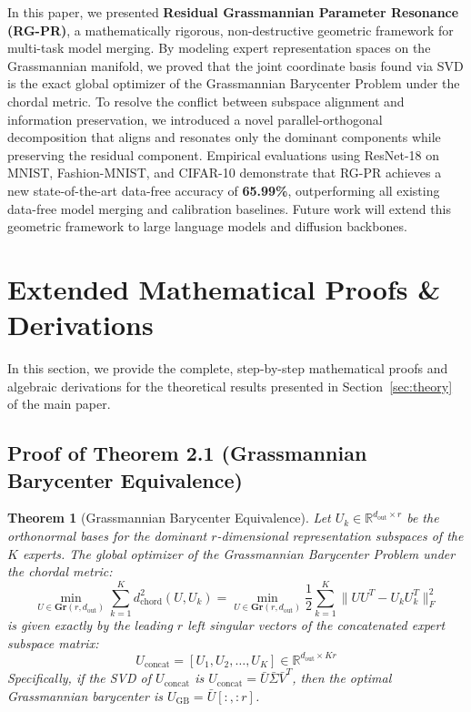 \documentclass{article}
\theoremstyle{plain}
\newtheorem*{theorem*}{Theorem}
\theoremstyle{definition}
\theoremstyle{remark}
\begin{document}
In this paper, we presented \textbf{Residual Grassmannian Parameter Resonance (RG-PR)}, a mathematically rigorous, non-destructive geometric framework for multi-task model merging. By modeling expert representation spaces on the Grassmannian manifold, we proved that the joint coordinate basis found via SVD is the exact global optimizer of the Grassmannian Barycenter Problem under the chordal metric. To resolve the conflict between subspace alignment and information preservation, we introduced a novel parallel-orthogonal decomposition that aligns and resonates only the dominant components while preserving the residual component. Empirical evaluations using ResNet-18 on MNIST, Fashion-MNIST, and CIFAR-10 demonstrate that RG-PR achieves a new state-of-the-art data-free accuracy of \textbf{65.99\%}, outperforming all existing data-free model merging and calibration baselines. Future work will extend this geometric framework to large language models and diffusion backbones.




\newpage
\appendix
\onecolumn

\section{Extended Mathematical Proofs \& Derivations}
\label{app:proofs}

In this section, we provide the complete, step-by-step mathematical proofs and algebraic derivations for the theoretical results presented in Section~\ref{sec:theory} of the main paper.

\subsection{Proof of Theorem 2.1 (Grassmannian Barycenter Equivalence)}
\label{app:proof_theorem_2_1}

\begin{theorem*}[Grassmannian Barycenter Equivalence]
Let $U_k \in \mathbb{R}^{d_{\text{out}} \times r}$ be the orthonormal bases for the dominant $r$-dimensional representation subspaces of the $K$ experts. The global optimizer of the Grassmannian Barycenter Problem under the chordal metric:
\begin{equation}
\min_{U \in \mathbf{Gr}(r, d_{\text{out}})} \sum_{k=1}^K d^2_{\text{chord}}(U, U_k) = \min_{U \in \mathbf{Gr}(r, d_{\text{out}})} \frac{1}{2} \sum_{k=1}^K \| U U^T - U_k U_k^T \|_F^2
\end{equation}
is given exactly by the leading $r$ left singular vectors of the concatenated expert subspace matrix:
\begin{equation}
U_{\text{concat}} = [U_1, U_2, \ldots, U_K] \in \mathbb{R}^{d_{\text{out}} \times Kr}
\end{equation}
Specifically, if the SVD of $U_{\text{concat}}$ is $U_{\text{concat}} = \bar{U} \bar{\Sigma} \bar{V}^T$, then the optimal Grassmannian barycenter is $U_{\text{GB}} = \bar{U}[:, :r]$.
\end{theorem*}
\end{document}
